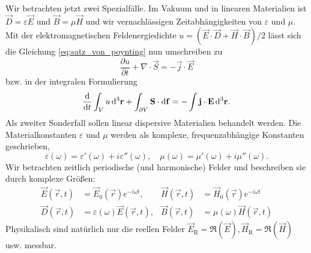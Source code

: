 Wir betrachten jetzt zwei Spezialfälle. Im Vakuum und in linearen Materialien ist $\vec {D}=\varepsilon \vec {E}$ und $\vec {B}=\mu \vec {H}$ und wir vernachlässigen Zeitabhängigkeiten von $\varepsilon $ und $\mu $. Mit der elektromagnetischen Feldenergiedichte $u=\left(\vec {E}\cdot \vec {D}+\vec {H}\cdot \vec {B}\right)/2$ lässt sich die Gleichung \eqref{eq:satz_von_poynting} nun umschreiben zu
\begin{equation*}
	\frac{\partial u}{\partial t}+\nabla \cdot \vec {S}=-\vec {j}\cdot \vec {E}
\end{equation*}
bzw. in der integralen Formulierung
\begin{equation*}
	\frac{\mathop{}\!\mathrm{d} }{\mathop{}\!\mathrm{d} t}\int _{V}u\mathop{}\!\mathrm{d} ^{3}\mathbf{r}+\int _{\partial V}\mathbf{S}\cdot \mathop{}\!\mathrm{d} \mathbf{f}=-\int \mathbf{j}\cdot \mathbf{E}\mathop{}\!\mathrm{d} ^{3}\mathbf{r}.
\end{equation*}
Als zweiter Sonderfall sollen linear dispersive Materialien behandelt werden. Die Materialkonstanten $\varepsilon $ und $\mu $ werden als komplexe, frequenzabhängige Konstanten geschrieben,
\begin{equation*}
	\varepsilon \left(\omega \right)=\varepsilon '\left(\omega \right)+i\varepsilon ''\left(\omega \right),\quad \mu \left(\omega \right)=\mu '\left(\omega \right)+i\mu ''\left(\omega \right).
\end{equation*}
Wir betrachten zeitlich periodische (und harmonische) Felder und beschreiben sie durch komplexe Größen:
\begin{align*}
	\vec {E}\left(\vec {r},t\right) & =\vec {E}_{0}\left(\vec {r}\right)e^{-i\omega t},                 & \vec {H}\left(\vec {r},t\right) & =\vec {H}_{0}\left(\vec {r}\right)e^{-i\omega t}         \\
	\vec {D}\left(\vec {r},t\right) & =\varepsilon \left(\omega \right)\vec {E}\left(\vec {r},t\right), & \vec {B}\left(\vec {r},t\right) & =\mu \left(\omega \right)\vec {H}\left(\vec {r},t\right)
\end{align*}
Physikalisch sind natürlich nur die reellen Felder $\vec {E}_{\mathrm{R}}=\mathfrak{R}\left(\vec {E}\right), \vec {H}_{\mathrm{R}}=\mathfrak{R}\left(\vec {H}\right)$ usw. messbar. 

